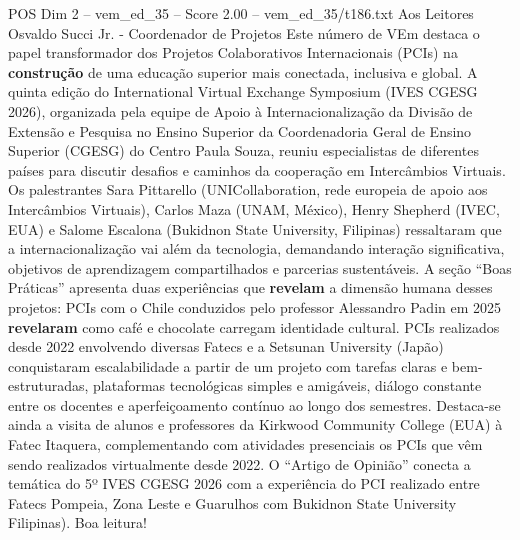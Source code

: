 \begin{textsample}{POS Dim 2 – vem\_ed\_35 – Score 2.00 – vem\_ed\_35/t186.txt}  \label{ex:f2_pos_003}
Aos Leitores Osvaldo Succi Jr. - Coordenador de Projetos Este número de VEm destaca o papel transformador dos Projetos Colaborativos Internacionais (PCIs) na \textbf{construção} de uma educação superior mais conectada, inclusiva e global.
A quinta edição do International Virtual Exchange Symposium (IVES CGESG 2026), organizada pela equipe de Apoio à Internacionalização da Divisão de Extensão e Pesquisa no Ensino Superior da Coordenadoria Geral de Ensino Superior (CGESG) do Centro Paula Souza, reuniu especialistas de diferentes países para discutir desafios e caminhos da cooperação em Intercâmbios Virtuais.
Os palestrantes Sara Pittarello (UNICollaboration, rede europeia de apoio aos Intercâmbios Virtuais), Carlos Maza (UNAM, México), Henry Shepherd (IVEC, EUA) e Salome Escalona (Bukidnon State University, Filipinas) ressaltaram que a internacionalização vai além da tecnologia, demandando interação significativa, objetivos de aprendizagem compartilhados e parcerias sustentáveis.
A seção “Boas Práticas” apresenta duas experiências que \textbf{revelam} a dimensão humana desses projetos: PCIs com o Chile conduzidos pelo professor Alessandro Padin em 2025 \textbf{revelaram} como café e chocolate carregam identidade cultural.
PCIs realizados desde 2022 envolvendo diversas Fatecs e a Setsunan University (Japão) conquistaram escalabilidade a partir de um projeto com tarefas claras e bem-estruturadas, plataformas tecnológicas simples e amigáveis, diálogo constante entre os docentes e aperfeiçoamento contínuo ao longo dos semestres.
Destaca-se ainda a visita de alunos e professores da Kirkwood Community College (EUA) à Fatec Itaquera, complementando com atividades presenciais os PCIs que vêm sendo realizados virtualmente desde 2022.
O “Artigo de Opinião” conecta a temática do 5º IVES CGESG 2026 com a experiência do PCI realizado entre Fatecs Pompeia, Zona Leste e Guarulhos com Bukidnon State University Filipinas).
Boa leitura!

\end{textsample}
